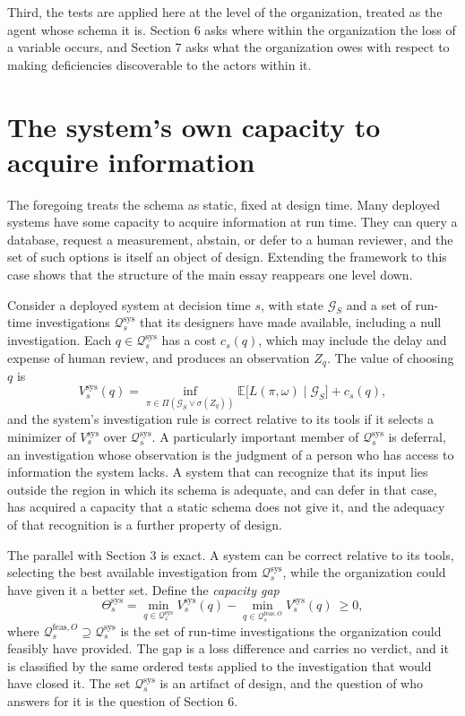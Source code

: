 \documentclass[11pt]{article}
\newcommand{\Q}{\mathcal Q}
\newcommand{\G}{\mathcal G}
\newcommand{\E}{\mathbb E}
\newcommand{\feas}{\mathrm{feas}}
\newcommand{\Th}{\Theta}
\theoremstyle{plain}
\theoremstyle{definition}
\begin{document}
Third, the tests are applied here at the level of the organization, treated as the agent whose schema it is. Section 6 asks where within the organization the loss of a variable occurs, and Section 7 asks what the organization owes with respect to making deficiencies discoverable to the actors within it.

\section{The system's own capacity to acquire information}

The foregoing treats the schema as static, fixed at design time. Many deployed systems have some capacity to acquire information at run time. They can query a database, request a measurement, abstain, or defer to a human reviewer, and the set of such options is itself an object of design. Extending the framework to this case shows that the structure of the main essay reappears one level down.

Consider a deployed system at decision time $s$, with state $\G_S$ and a set of run-time investigations $\Q_s^{\mathrm{sys}}$ that its designers have made available, including a null investigation. Each $q\in\Q_s^{\mathrm{sys}}$ has a cost $c_s(q)$, which may include the delay and expense of human review, and produces an observation $Z_q$. The value of choosing $q$ is
\[
V^{\mathrm{sys}}_s(q)=\inf_{\pi\in\Pi(\G_S\vee\sigma(Z_q))}\E\bigl[L(\pi,\omega)\mid\G_S\bigr]+c_s(q),
\]
and the system's investigation rule is correct relative to its tools if it selects a minimizer of $V^{\mathrm{sys}}_s$ over $\Q_s^{\mathrm{sys}}$. A particularly important member of $\Q_s^{\mathrm{sys}}$ is deferral, an investigation whose observation is the judgment of a person who has access to information the system lacks. A system that can recognize that its input lies outside the region in which its schema is adequate, and can defer in that case, has acquired a capacity that a static schema does not give it, and the adequacy of that recognition is a further property of design.

The parallel with Section 3 is exact. A system can be correct relative to its tools, selecting the best available investigation from $\Q_s^{\mathrm{sys}}$, while the organization could have given it a better set. Define the \emph{capacity gap}
\[
\Th^{\mathrm{sys}}_s=\min_{q\in\Q_s^{\mathrm{sys}}}V^{\mathrm{sys}}_s(q)-\min_{q\in\Q_s^{\feas,O}}V^{\mathrm{sys}}_s(q)\ \ge 0 ,
\]
where $\Q_s^{\feas,O}\supseteq\Q_s^{\mathrm{sys}}$ is the set of run-time investigations the organization could feasibly have provided. The gap is a loss difference and carries no verdict, and it is classified by the same ordered tests applied to the investigation that would have closed it. The set $\Q_s^{\mathrm{sys}}$ is an artifact of design, and the question of who answers for it is the question of Section 6.
\end{document}
